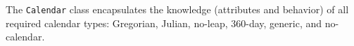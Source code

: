 
The {\tt Calendar} class encapsulates the knowledge (attributes and
behavior) of all required calendar types:  Gregorian, Julian, no-leap,
360-day, generic, and no-calendar.
